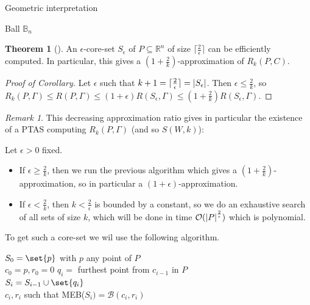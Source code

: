 \documentclass{article}
\theoremstyle{definition}
\newtheorem{theo}{Theorem}[section]
\theoremstyle{remark}
\newtheorem*{rk}{Remark}
\begin{document}
\begin{subsection}{Geometric interpretation}
\begin{subsubsection}{Ball $\mathbb{B}_n$}
    \begin{theo}[\cite{BK03}]
      \label{coreprop}
      An $\epsilon$-core-set $S_{\epsilon}$ of $P \subseteq \mathbb{R}^n$ of size $\lceil\frac{2}{\epsilon}\rceil$ can be efficiently computed. In particular, this gives a $(1+\frac{2}{k})$-approximation of $R_k(P,C)$.
    \end{theo}
  
  \begin{proof}[Proof of Corollary]
    Let $\epsilon$ such that $k+1 = \lceil\frac{2}{\epsilon}\rceil = \abs{S_{\epsilon}}$. Then $\epsilon \leq \frac{2}{k}$, so $R_k(P,\Gamma) \leq R(P,\Gamma) \leq (1+\epsilon)R(S_{\epsilon},\Gamma) \leq (1+\frac{2}{k})R(S_{\epsilon},\Gamma)$.
  \end{proof}

  \begin{rk}
    This decreasing approximation ratio gives in particular the existence of a PTAS computing $R_k(P,\Gamma)$ (and so $S(W,k)$):
    
    Let $\epsilon > 0$ fixed.
    \begin{itemize}
    \item If $\epsilon \geq \frac{2}{k}$, then we run the previous algorithm which gives a $(1 + \frac{2}{k})$-approximation, so in particular a $(1 + \epsilon)$-approximation.
    \item If $\epsilon < \frac{2}{k}$, then $k < \frac{2}{\epsilon}$ is bounded by a constant, so we do an exhaustive search of all sets of size $k$, which will be done in time $\mathcal{O}(\abs{P}^{\frac{2}{\epsilon}})$ which is polynomial.
    \end{itemize}
    
  \end{rk}
  To get such a core-set we wil use the following algorithm.
  
  \begin{algorithm}[H]
      \DontPrintSemicolon
      
      $S_0 = \set{p}$ with $p$ any point of $P$\\
      $c_0 = p, r_0 = 0$ 
         {
           $q_i =$ furthest point from $c_{i-1}$ in $P$\\
           $S_{i} = S_{i-1} \cup \set{q_i}$\\
           $c_i,r_i$ such that MEB($S_i)=\mathcal{B}(c_i,r_i)$\\
         }
         

\end{algorithm}
\end{subsubsection}
\end{subsection}
\end{document}
